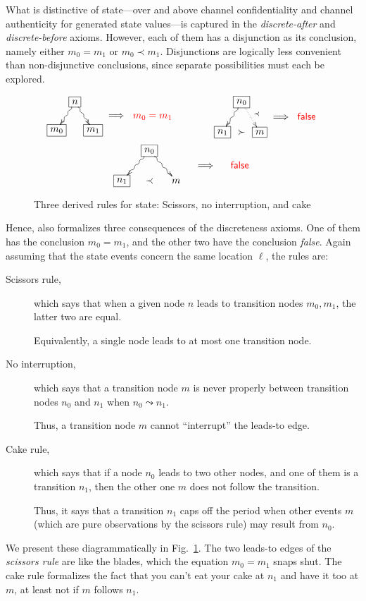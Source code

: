 What is distinctive of state---over and above channel confidentiality
and channel authenticity for generated state values---is captured in
the \emph{discrete-after} and \emph{discrete-before} axioms.  However,
each of them has a disjunction as its conclusion, namely either
$m_0=m_1$ or $m_0\prec m_1$.  Disjunctions are logically less
convenient than non-disjunctive conclusions, since separate
possibilities must each be explored.
%
\begin{figure}
  \centering\[ \xymatrix@R=1mm@C=1mm{&
      *+[F]{n}\ar@{~>}[ddl]\ar@{~>}[ddr] & \\
      & & & \Longrightarrow &  \textcolor{red}{m_0=m_1}  \\
      *+[F]{m_0} & & *+[F]{m_1}} \qquad\qquad
    \xymatrix@R=1mm@C=1mm{&
      *+[F]{n_0}\ar@{~>}[ddl]\ar@{.>}[ddr]^{\prec} & \\
      & & & \Longrightarrow &  \textcolor{red}{\mathsf{false}}  \\
      *+[F]{n_1} &\succ & *+[F]{m}}
  \]
  \[ \xymatrix@R=1mm@C=4mm{&
      *+[F]{n_0}\ar@{~>}[ddl]\ar@{~>}[ddr] & \\
      & & & \Longrightarrow &  \textcolor{red}{\mathsf{false}}  \\
      *+[F]{n_1} &\prec & {m}}
  \]
  \caption{Three derived rules for state:  Scissors, no interruption,
    and cake}
  \label{fig:derived:state:rules}
\end{figure}
%
Hence, {\cpsa} also formalizes three consequences of the discreteness
axioms.  One of them has the conclusion $m_0=m_1$, and the other two
have the conclusion \emph {false}.  Again assuming that the state
events concern the same location $\ell$, the rules are:
%
\begin{description}
  \item[Scissors rule,] which says that when a given node $n$ leads to
  transition nodes $m_0,m_1$, the latter two are equal.

  Equivalently, a single node leads to at most one transition node.
  \item[No interruption,] which says that a transition node $m$ is
  never properly between transition nodes $n_0$ and $n_1$ when
  $n_0\leadsto n_1$.

  Thus, a transition node $m$ cannot ``interrupt'' the leads-to edge.
  \item[Cake rule,] which says that if a node $n_0$ leads to two other
  nodes, and one of them is a transition $n_1$, then the other one $m$
  does not follow the transition.

  Thus, it says that a transition $n_1$ caps off the period when other
  events $m$ (which are pure observations by the scissors rule) may
  result from $n_0$.
\end{description}
%
We present these diagrammatically in
Fig.~\ref{fig:derived:state:rules}.  The two leads-to edges of the
\emph{scissors rule} are like the blades, which the equation
${m_0=m_1}$ snaps shut.  The cake rule formalizes the fact that you
can't eat your cake at $n_1$ and have it too at $m$, at least not if
$m$ follows $n_1$.

